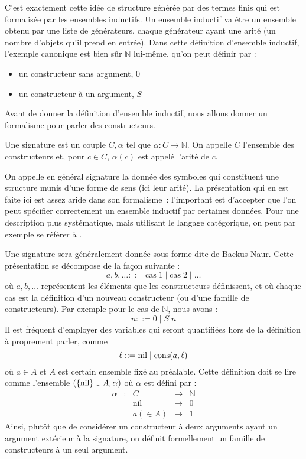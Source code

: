 C'est exactement cette idée de structure générée par des termes finis qui est
formalisée par les ensembles inductifs. Un ensemble inductif va être un ensemble
obtenu par une liste de générateurs, chaque générateur ayant une arité (un
nombre d'objets qu'il prend en entrée). Dans cette définition d'ensemble
inductif, l'exemple canonique est bien sûr $\mathbb N$ lui-même, qu'on peut
définir par :
\begin{itemize}
\item un constructeur sans argument, $0$
\item un constructeur à un argument, $S$
\end{itemize}

Avant de donner la définition d'ensemble inductif, nous allons donner un
formalisme pour parler des constructeurs.

\begin{definition}[Signature]
  Une signature est un couple $C,\alpha$ tel que $\alpha : C \to \mathbb N$.
  On appelle $C$ l'ensemble des constructeurs et, pour $c \in C$, $\alpha(c)$
  est appelé l'arité de $c$.
\end{definition}

On appelle en général signature la donnée des symboles qui constituent une
structure munis d'une forme de sens (ici leur arité). La présentation qui en est
faite ici est assez aride dans son formalisme~: l'important est d'accepter que
l'on peut spécifier correctement un ensemble inductif par certaines données.
Pour une description plus systématique, mais utilisant le langage catégorique,
on peut par exemple se référer à \cite{JacobsCLTT}.

Une signature sera généralement donnée sous forme dite de Backus-Naur. Cette
présentation se décompose de la façon suivante :
\[a,b,\ldots ::= \mathrm{cas}\;1 \mid \mathrm{cas}\;2 \mid \ldots\]
où $a,b,\ldots$ représentent les éléments que les constructeurs définissent,
et où chaque cas est la définition d'un nouveau constructeur (ou d'une famille
de constructeurs). Par exemple pour le cas de $\mathbb N$, nous avons :
\[n ::= 0 \mid S\;n\]
Il est fréquent d'employer des variables qui seront quantifiées hors de la
définition à proprement parler, comme
\[\ell ::= \operatorname{nil} \mid \operatorname{cons}(a,\ell)\]
où $a \in A$ et $A$ est certain ensemble fixé au préalable. Cette définition
doit se lire comme l'ensemble $(\{\operatorname{nil}\} \cup A,\alpha)$ où $\alpha$
est défini par :
\[
\begin{array}{rcccl}
  \alpha &:& C & \longrightarrow & \mathbb N\\
  & & \mathrm{nil} & \longmapsto & 0 \\
  & & a (\in A) & \longmapsto & 1
\end{array}
\]
Ainsi, plutôt que de considérer un constructeur à deux arguments ayant un
argument extérieur à la signature, on définit formellement un famille de
constructeurs à un seul argument.

